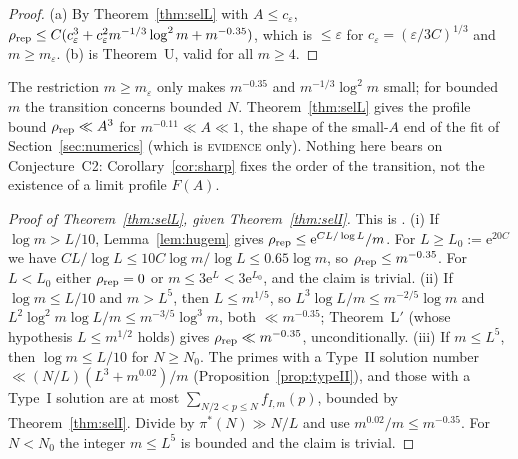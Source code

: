 \documentclass[10pt,reqno]{amsart}
\theoremstyle{definition}
\newcommand{\e}{\mathrm e}
\newcommand{\status}[1]{\textup{\textsc{#1}}}
\begin{document}
\begin{proof}
(a) By Theorem~\ref{thm:selL} with $A\leq c_\varepsilon$,
$\rho_{\rm rep}\leq C(c_\varepsilon^3+c_\varepsilon^2m^{-1/3}\log^2m+m^{-0.35})$,
which is $\leq\varepsilon$ for $c_\varepsilon=(\varepsilon/3C)^{1/3}$ and $m\geq m_\varepsilon$.
(b) is Theorem~U, valid for all $m\geq4$.
\end{proof}

The restriction $m\geq m_\varepsilon$ only makes $m^{-0.35}$ and
$m^{-1/3}\log^2m$ small; for bounded $m$ the transition concerns bounded
$N$.  Theorem~\ref{thm:selL} gives the profile bound $\rho_{\rm rep}\ll A^3$
for $m^{-0.11}\ll A\ll1$, the shape of the small-$A$ end of the fit of
Section~\ref{sec:numerics} (which is \status{evidence} only).  Nothing
here bears on Conjecture~C2: Corollary~\ref{cor:sharp} fixes the order of
the transition, not the existence of a limit profile $F(A)$.

\begin{proof}[Proof of Theorem~\ref{thm:selL}, given Theorem~\ref{thm:selI}]
This is \cite[Thm.~5.1]{MN4}.
(i) If $\log m>L/10$, Lemma~\ref{lem:hugem} gives
$\rho_{\rm rep}\leq\e^{CL/\log L}/m$.  For $L\geq L_0:=\e^{20C}$ we have
$CL/\log L\leq10C\log m/\log L\leq0.65\log m$, so $\rho_{\rm rep}\leq m^{-0.35}$.
For $L<L_0$ either $\rho_{\rm rep}=0$ or $m\leq3\e^{L}<3\e^{L_0}$, and the
claim is trivial.
(ii) If $\log m\leq L/10$ and $m>L^5$, then $L\leq m^{1/5}$, so
$L^3\log L/m\leq m^{-2/5}\log m$ and $L^2\log^2m\log L/m\leq m^{-3/5}\log^3m$,
both $\ll m^{-0.35}$; Theorem~L$'$ (whose hypothesis $L\leq m^{1/2}$ holds)
gives $\rho_{\rm rep}\ll m^{-0.35}$, unconditionally.
(iii) If $m\leq L^5$, then $\log m\leq L/10$ for $N\geq N_0$.  The primes with a
Type~II solution number $\ll(N/L)(L^3+m^{0.02})/m$
(Proposition~\ref{prop:typeII}), and those with a Type~I solution are at
most $\sum_{N/2<p\leq N}f_{I,m}(p)$, bounded by Theorem~\ref{thm:selI}.
Divide by $\pi^*(N)\gg N/L$ and use $m^{0.02}/m\leq m^{-0.35}$.  For
$N<N_0$ the integer $m\leq L^5$ is bounded and the claim is trivial.
\end{proof}
\end{document}
